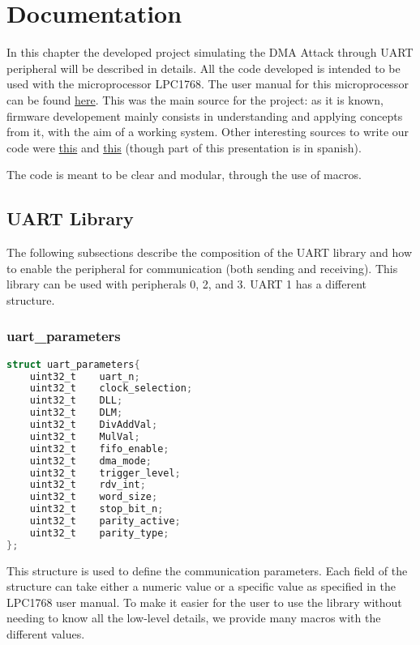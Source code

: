 \chapter{Documentation} \label{CH_doc}
In this chapter the developed project simulating the DMA Attack through UART peripheral will be described in details.
All the code developed is intended to be used with the microprocessor LPC1768. The user manual for this microprocessor can be found \href{https://www.keil.com/dd/docs/datashts/philips/lpc17xx_um.pdf}{here}. This was the main source for the project: as it is known, firmware developement mainly consists in understanding and applying concepts from it, with the aim of a working system. Other interesting sources to write our code were \href{https://community.nxp.com/t5/LPC-Microcontrollers/LPC1768-UART-receive-using-DMA/m-p/800746}{this} and  \href{https://www.cartagena99.com/recursos/alumnos/apuntes/Tema%202.%20Perifericos%20en%20el%20LPC1768%20(ppt).pdf}{this} (though part of this presentation is in spanish). 

The code is meant to be clear and modular, through the use of macros.

\section{UART Library}
The following subsections describe the composition of the UART library and how to enable the peripheral for communication (both sending and receiving). This library can be used with peripherals 0, 2, and 3. UART 1 has a different structure.

\subsection{uart\_parameters}

\begin{lstlisting}[language= C, caption = Structure definition for UART parameters]
struct uart_parameters{
	uint32_t	uart_n;
	uint32_t	clock_selection;
	uint32_t	DLL;
	uint32_t	DLM;
	uint32_t	DivAddVal;
	uint32_t	MulVal;
	uint32_t	fifo_enable;
	uint32_t	dma_mode;
	uint32_t	trigger_level;
	uint32_t	rdv_int;
	uint32_t	word_size;
	uint32_t	stop_bit_n;
	uint32_t	parity_active;
	uint32_t	parity_type;
};
\end{lstlisting} \label{uart_struct}

This structure is used to define the communication parameters. Each field of the structure can take either a numeric value or a specific value as specified in the LPC1768 user manual. To make it easier for the user to use the library without needing to know all the low-level details, we provide many macros with the different values.

